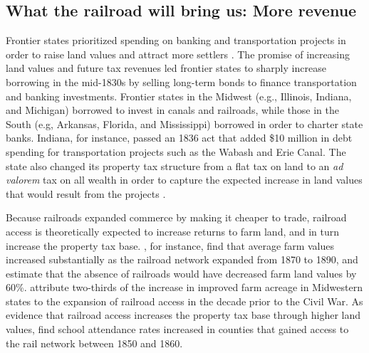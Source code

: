 \documentclass[12pt]{article}
\newcommand{\possessivecite}[1]{\citeauthor{#1}'s (\citeyear{#1})}
\begin{document}
\subsection{What the railroad will bring us: More revenue}


Frontier states prioritized spending on banking and transportation projects in order to raise land values and attract more settlers \citep{sylla1998anatomy}. The promise of increasing land values and future tax revenues led frontier states to sharply increase borrowing in the mid-1830s by selling long-term bonds to finance transportation and banking investments. Frontier states in the Midwest (e.g., Illinois, Indiana, and Michigan) borrowed to invest in canals and railroads, while those in the South (e.g, Arkansas, Florida, and Mississippi) borrowed in order to charter state banks. Indiana, for instance, passed an 1836 act that added \$10 million in debt spending for transportation projects such as the Wabash and Erie Canal. The state also changed its property tax structure from a flat tax on land to an \emph{ad valorem} tax on all wealth in order to capture the expected increase in land values that would result from the projects \citep{wallis2004sovereign}.

Because railroads expanded commerce by making it cheaper to trade, railroad access is theoretically expected to increase returns to farm land, and in turn increase the property tax base. \citet{donaldson2016railroads}, for instance, find that average farm values increased substantially as the railroad network expanded from 1870 to 1890, and estimate that the absence of railroads would have decreased farm land values by 60\%. \citet{atack2011impact} attribute two-thirds of the increase in improved farm acreage in Midwestern states to the expansion of railroad access in the decade prior to the Civil War. As evidence that railroad access increases the property tax base through higher land values, \citet{atack2012impact} find school attendance rates increased in counties that gained access to the rail network between 1850 and 1860. 

\end{document}
